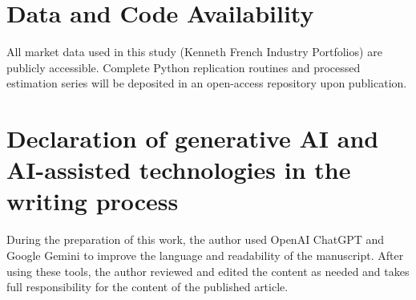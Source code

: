 \documentclass[12pt,authoryear]{elsarticle}
\begin{document}
\section*{Data and Code Availability}
All market data used in this study (Kenneth French Industry Portfolios) are publicly accessible. Complete Python replication routines and processed estimation series will be deposited in an open-access repository upon publication.

\section*{Declaration of generative AI and AI-assisted technologies in the writing process}
During the preparation of this work, the author used OpenAI ChatGPT and Google Gemini to improve the language and readability of the manuscript. After using these tools, the author reviewed and edited the content as needed and takes full responsibility for the content of the published article.
\end{document}
